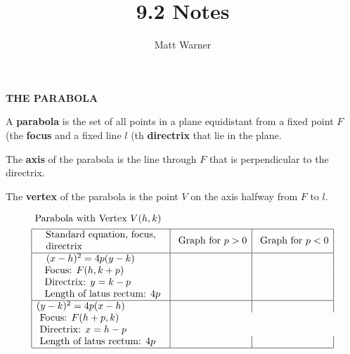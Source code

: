 \documentclass{report}
\title{\Huge{9.2 Notes}}
\author{\huge{Matt Warner}}
\date{\huge{}}
\begin{document}
	\maketitle
	

\begin{LARGE}
	\begin{center}
		\textbf{THE PARABOLA} 
	\end{center}
\end{LARGE}
\bigbreak \noindent
\begin{large}

\noindent A \textbf{parabola} is the set of all points in a plane equidistant from a fixed point $F$ (the \textbf{focus} and a fixed line $l$ (th \textbf{directrix} that lie in the plane.
\vspace{5mm}

\noindent The \textbf{axis} of the parabola is the line through $F$ that is perpendicular to the directrix.
\vspace{5mm}

\noindent The \textbf{vertex} of the parabola is the point $V$ on the axis halfway from $F$ to $l$.

\end{large}
\bigbreak \noindent

\begin{center}
\begin{align*}
&\text { Parabola with Vertex } V(h, k)\\
&\begin{array}{|l|l|l|}
\hline \multicolumn{1}{|c|}{\begin{array}{l}
\text { Standard equation, focus, } \\
\text { directrix }
\end{array}} & \text { Graph for } p>0 & \text { Graph for } p<0 \\
\hline \quad(x-h)^2=4 p(y-k) & & \\
\begin{array}{l}
\text { Focus: } F(h, k+p) \\
\text { Directrix: } y=k-p \\
\text { Length of latus rectum: } 4 p
\end{array} & & \\
\hline(y-k)^2=4 p(x-h) & & \\
\text { Focus: } F(h+p, k) \\
\text { Directrix: } x=h-p \\
\text { Length of latus rectum: } 4 p & & \\
\hline
\end{array}
\end{align*}
\end{center}
\end{document}
